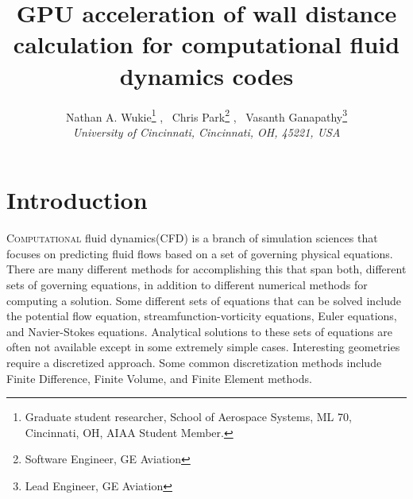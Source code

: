\documentclass[]{aiaa-tc}%
\title{GPU acceleration of wall distance calculation for
   computational fluid dynamics codes}
\author{
   Nathan A. Wukie\thanks{Graduate student researcher, School of Aerospace Systems, ML 70, 
     Cincinnati, OH, AIAA Student Member.} ,
   \ Chris Park\thanks{Software Engineer, GE Aviation} ,
   \ Vasanth Ganapathy\thanks{Lead Engineer, GE Aviation} \\
   {\normalsize\itshape
     University of Cincinnati, Cincinnati, OH, 45221, USA}\\
 }
\begin{document}
\maketitle




\section{Introduction}
\lettrine[nindent=0pt]{C}{omputational} fluid dynamics(CFD) is a branch of
simulation sciences that focuses on predicting fluid flows based on a
set of governing physical equations. There are many different methods
for accomplishing this that span both, different sets of governing
equations, in addition to different numerical methods for computing a
solution. Some different sets of equations that can be solved include
the potential flow equation, streamfunction-vorticity equations, Euler
equations, and Navier-Stokes equations. Analytical solutions to these
sets of equations are often not available except in some extremely
simple cases. Interesting geometries require a discretized
approach. Some common discretization methods include Finite Difference,
Finite Volume, and Finite Element methods. 
\end{document}
